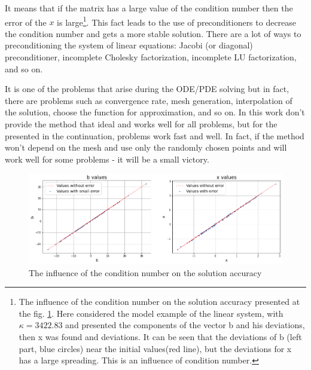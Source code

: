 It means that if the matrix has a large value of the condition number then the error of the $x$ is large\footnote{The influence of the condition number on the solution accuracy presented at the fig. \ref{fig:ill_condition_demo}. Here considered the model example of the linear system, with $\kappa = 3422.83$ and presented the components of the vector b and his deviations, then x was found and deviations. It can be seen that the deviations of b (left part, blue circles) near the initial values(red line), but the deviations for x has a large spreading. This is an influence of condition number.}.
This fact leads to the use of preconditioners to decrease the condition number and gets a more stable solution. There are a lot of ways to preconditioning the system of linear equations: Jacobi (or diagonal) preconditioner, incomplete Cholesky factorization, incomplete LU factorization, and so on. 

It is one of the problems that arise during the ODE/PDE solving but in fact, there are problems such as convergence rate, mesh generation, interpolation of the solution, choose the function for approximation, and so on. In this work don't provide the method that ideal and works well for all problems, but for the presented in the continuation, problems work fast and well. In fact, if the method won't depend on the mesh and use only the randomly chosen points and will work well for some problems - it will be a small victory. 

\begin{figure}[h]
	\centering
	\includegraphics[width=\textwidth]{images/chapter2/ill_condition_demo.png}
	\caption{The influence of the condition number on the solution accuracy}
	\label{fig:ill_condition_demo}
\end{figure}